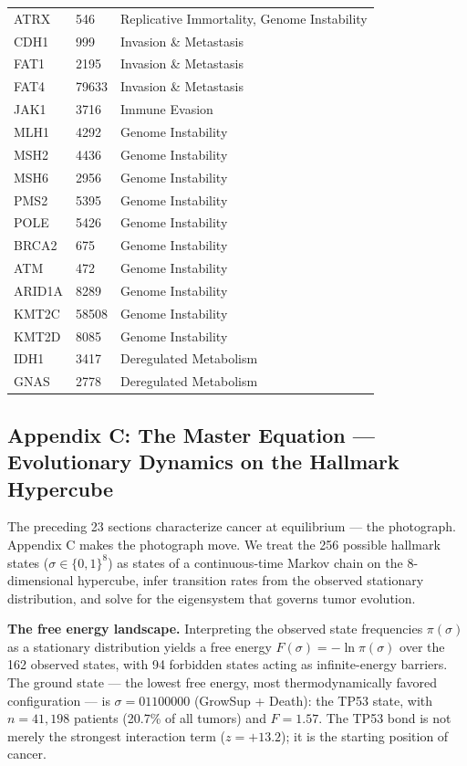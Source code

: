 \documentclass[
  11pt,
]{article}
\begin{document}
{\begin{longtable}[]{@{}lll@{}}
ATRX & 546 & Replicative Immortality, Genome Instability \\
CDH1 & 999 & Invasion \& Metastasis \\
FAT1 & 2195 & Invasion \& Metastasis \\
FAT4 & 79633 & Invasion \& Metastasis \\
JAK1 & 3716 & Immune Evasion \\
MLH1 & 4292 & Genome Instability \\
MSH2 & 4436 & Genome Instability \\
MSH6 & 2956 & Genome Instability \\
PMS2 & 5395 & Genome Instability \\
POLE & 5426 & Genome Instability \\
BRCA2 & 675 & Genome Instability \\
ATM & 472 & Genome Instability \\
ARID1A & 8289 & Genome Instability \\
KMT2C & 58508 & Genome Instability \\
KMT2D & 8085 & Genome Instability \\
IDH1 & 3417 & Deregulated Metabolism \\
GNAS & 2778 & Deregulated Metabolism \\
\end{longtable}
}

\subsection{Appendix C: The Master Equation --- Evolutionary Dynamics on
the Hallmark
Hypercube}\label{appendix-c-the-master-equation-evolutionary-dynamics-on-the-hallmark-hypercube}

The preceding 23 sections characterize cancer at equilibrium --- the
photograph. Appendix C makes the photograph move. We treat the 256
possible hallmark states (\(\sigma \in \{0,1\}^8\)) as states of a
continuous-time Markov chain on the 8-dimensional hypercube, infer
transition rates from the observed stationary distribution, and solve
for the eigensystem that governs tumor evolution.

\textbf{The free energy landscape.} Interpreting the observed state
frequencies \(\pi(\sigma)\) as a stationary distribution yields a free
energy \(F(\sigma) = -\ln \pi(\sigma)\) over the 162 observed states,
with 94 forbidden states acting as infinite-energy barriers. The ground
state --- the lowest free energy, most thermodynamically favored
configuration --- is \(\sigma = 01100000\) (GrowSup + Death): the TP53
state, with \(n = 41{,}198\) patients (20.7\% of all tumors) and
\(F = 1.57\). The TP53 bond is not merely the strongest interaction term
(\(z = +13.2\)); it is the starting position of cancer.
\end{document}
